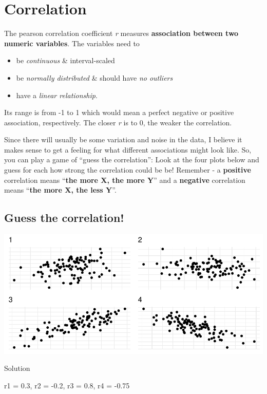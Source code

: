 \documentclass[
]{book}
\providecommand{\tightlist}{%
  \setlength{\itemsep}{0pt}\setlength{\parskip}{0pt}}
\begin{document}
\section{Correlation}\label{correlation}

The pearson correlation coefficient \emph{r} measures \textbf{association between two numeric variables}.
The variables need to

\begin{itemize}
\tightlist
\item
  be \emph{continuous} \& interval-scaled
\item
  be \emph{normally distributed} \& should have \emph{no outliers}
\item
  have a \emph{linear relationship}.
\end{itemize}

Its range is from -1 to 1 which would mean a perfect negative or positive association, respectively.
The closer \emph{r} is to 0, the weaker the correlation.

Since there will usually be some variation and noise in the data, I believe it makes sense to get a feeling for what different associations might look like.
So, you can play a game of ``guess the correlation'': Look at the four plots below and guess for each how strong the correlation could be be!
Remember - a \textbf{positive} correlation means ``\textbf{the more X, the more Y}'' and a \textbf{negative} correlation means ``\textbf{the more X, the less Y}''.

\subsection{Guess the correlation!}\label{guess-the-correlation}

\includegraphics{_main_files/figure-html/corr1-1.pdf}

Solution

r1 = 0.3, r2 = -0.2, r3 = 0.8, r4 = -0.75
\end{document}
